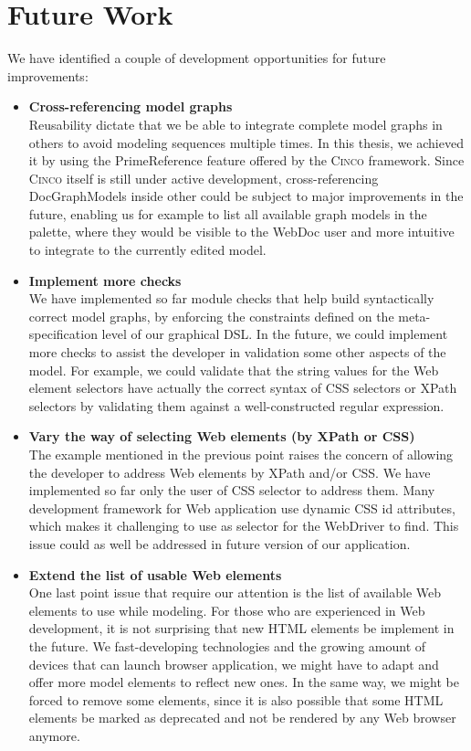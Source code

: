 \chapter{Future Work}\label{ch:futwork}

We have identified a couple of development opportunities for future improvements:
\begin{itemize}
    \item \textbf{Cross-referencing model graphs}\\
        Reusability dictate that we be able to integrate complete model graphs in others to avoid modeling sequences multiple times. In this thesis, we achieved it by using the PrimeReference feature offered by the \textsc{Cinco} framework. Since \textsc{Cinco} itself is still under active development, cross-referencing DocGraphModels inside other could be subject to major improvements in the future, enabling us for example to list all available graph models in the palette, where they would be visible to the WebDoc user and more intuitive to integrate to the currently edited model.
    \item \textbf{Implement more checks}\\
        We have implemented so far module checks that help build syntactically correct model graphs, by enforcing the constraints defined on the meta-specification level of our graphical DSL. In the future, we could implement more checks to assist the developer in validation some other aspects of the model. For example, we could validate that the string values for the Web element selectors have actually the correct syntax of CSS selectors or XPath selectors by validating them against a well-constructed regular expression.
    \item \textbf{Vary the way of selecting Web elements (by XPath or CSS)}\\
        The example mentioned in the previous point raises the concern of allowing the developer to address Web elements by XPath and/or CSS. We have implemented so far only the user of CSS selector to address them. Many development framework for Web application use dynamic CSS id attributes, which makes it challenging to use as selector for the WebDriver to find. This issue could as well be addressed in future version of our application.
    \item \textbf{Extend the list of usable Web elements}\\
        One last point issue that require our attention is the list of available Web elements to use while modeling. For those who are experienced in Web development, it is not surprising that new HTML elements be implement in the future. We fast-developing technologies and the growing amount of devices that can launch browser application, we might have to adapt and offer more model elements to reflect new ones. In the same way, we might be forced to remove some elements, since it is also possible that some HTML elements be marked as deprecated and not be rendered by any Web browser anymore.


\end{itemize}
